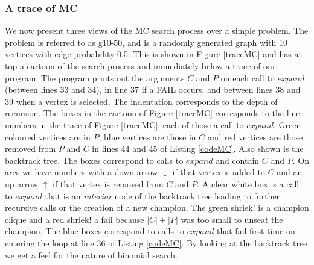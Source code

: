 \documentclass{l4proj}
\begin{document}
\subsubsection{A trace of MC}
We now present three views of the MC search process over a simple problem. The problem
is referred to as g10-50, and is a randomly generated graph with 10 vertices with edge probability 0.5. This is shown in
Figure \ref{traceMC} and has at top a cartoon of the search process and immediately below a trace of our program.
The program prints out the arguments $C$ and $P$ on each call to $expand$ (between lines 33 and 34), in line 37 if a FAIL occurs,
and between lines 38 and 39 when a vertex is selected. The indentation corresponds to the depth of recursion.
The  boxes in the cartoon of Figure \ref{traceMC} corresponds
to the line numbers in the trace of Figure \ref{traceMC}, each of those a call to $expand$. Green coloured vertices are 
in $P$, blue vertices are those in $C$ and red vertices are those removed from $P$ and $C$ in lines 44 and 45 of 
Listing \ref{codeMC}. Also shown is the backtrack tree. The boxes correspond to calls to $expand$ and
contain $C$ and $P$. On arcs we have numbers with a down arrow $\downarrow$ if that vertex is added to $C$ and an up arrow
$\uparrow$ if that vertex is removed from $C$ and $P$. A clear white box is a call to $expand$ that is an \emph{interior} 
node of the backtrack tree
leading to further recursive calls or the creation of a new champion. The green shriek! is a champion clique and a red shriek! a
fail because $|C| + |P|$ was too small to unseat the champion. The blue boxes correspond to calls to $expand$ that fail first time on
entering the loop at line 36 of Listing \ref{codeMC}. By looking at the backtrack tree we get a feel for the nature of binomial search.
\end{document}
